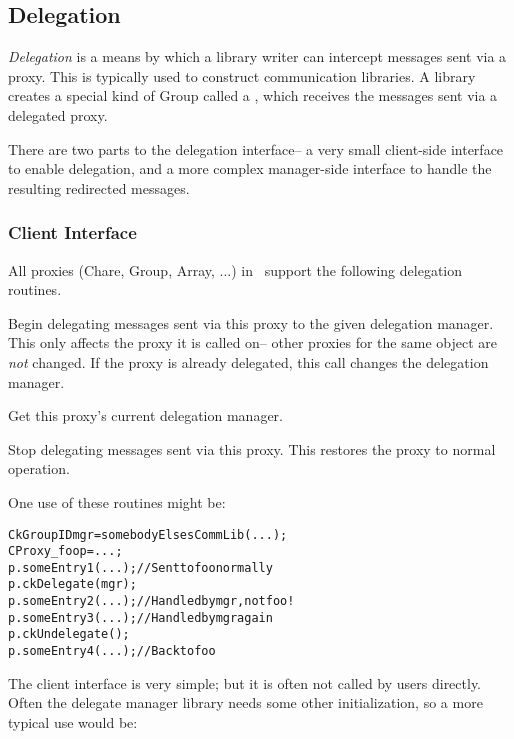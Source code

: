 \subsection{Delegation}

\label{delegation}

{\em Delegation} is a means by which a library writer can 
intercept messages sent via a proxy.  This is typically
used to construct communication libraries.
A library creates a special kind of Group called a 
, which receives the messages
sent via a delegated proxy.

There are two parts to the delegation interface-- a
very small client-side interface to enable delegation,
and a more complex manager-side interface to handle
the resulting redirected messages.

\subsubsection{Client Interface}

All proxies (Chare, Group, Array, ...) in \charmpp\ 
support the following delegation routines.

Begin delegating messages sent via this proxy to the
given delegation manager. This only affects
the proxy it is called on-- other proxies for the
same object are {\em not} changed. If the proxy is 
already delegated, this call changes the delegation manager.

Get this proxy's current delegation manager.

Stop delegating messages sent via this proxy.  
This restores the proxy to normal operation.

One use of these routines might be:

\begin{alltt}
  CkGroupID mgr=somebodyElsesCommLib(...);
  CProxy_foo p=...;
  p.someEntry1(...); //Sent to foo normally
  p.ckDelegate(mgr);
  p.someEntry2(...); //Handled by mgr, not foo!
  p.someEntry3(...); //Handled by mgr again
  p.ckUndelegate();
  p.someEntry4(...); //Back to foo
\end{alltt}

The client interface is very simple; but it is often
not called by users directly.  Often the delegate 
manager library needs some other initialization,
so a more typical use would be:

